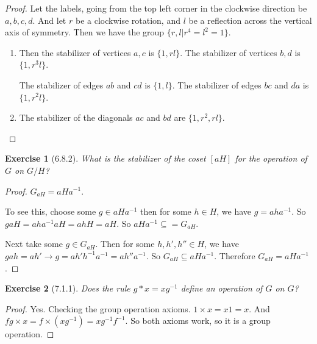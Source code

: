 \documentclass[12pt]{article}
\newtheorem*{exer}{Exercise}
\begin{document}
\begin{proof}
    Let the labels, going from the top left corner in the clockwise
    direction be $a, b, c, d$. And let $r$ be a clockwise rotation, and
    $l$ be a reflection across the vertical axis of symmetry. Then we
    have the group $\{r, l | r^4 = l^2 = 1\}$.

    \begin{enumerate}
        \item Then the stabilizer of vertices $a, c$ is $\{1, rl\}$. The
            stabilizer of vertices $b, d$ is $\{1, r^3l\}$. 

            The stabilizer of edges $ab$ and $cd$ is $\{1, l\}$. The
            stabilizer of edges $bc$ and $da$ is $\{1, r^2l\}$.

        \item The stabilizer of the diagonals $ac$ and $bd$ are $\{1,
            r^2, rl\}$.

    \end{enumerate}

\end{proof}


\begin{exer}[6.8.2]
    What is the stabilizer of the coset $[aH]$ for the operation of $G$
    on $G/H$?
\end{exer}

\begin{proof}
    $G_{aH} = aHa^{-1}$.

    To see this, choose some $g \in aHa^{-1}$ then for some $h \in H$,
    we have $g = aha^{-1}$. So $gaH = aha^{-1}aH = ahH = aH$. So
    $aHa^{-1} \subseteq = G_{aH}$.

    Next take some $g \in G_{aH}$. Then for some $h, h', h'' \in H$, we
    have $gah = ah' \rightarrow g = ah'h^{-1}a^{-1} = ah''a^{-1}$. So
    $G_{aH} \subseteq aHa^{-1}$. Therefore $G_{aH} = aHa^{-1}$.

\end{proof}


\begin{exer}[7.1.1]
    Does the rule $g * x = x g^{-1}$ define an operation of $G$ on $G$?
\end{exer}

\begin{proof}
    Yes. Checking the group operation axioms. $1 \times x = x1 = x$. And
    $fg \times x = f \times (xg^{-1}) = x g^{-1} f^{-1}$. So both axioms
    work, so it is a group operation.

\end{proof}
\end{document}
